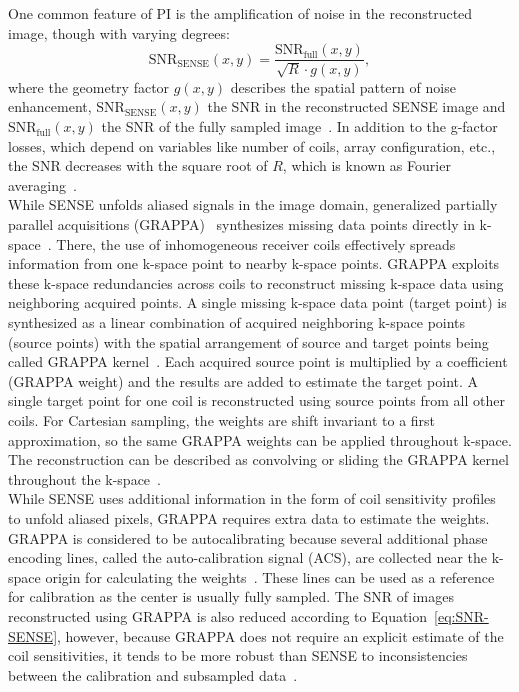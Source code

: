 One common feature of PI is the amplification of noise in the reconstructed image, though with varying degrees:
\begin{equation} \label{eq:SNR-SENSE}
	\text{SNR}_{\text{SENSE}}(x,y) = \frac{\text{SNR}_{\text{full}}(x,y)}{\sqrt{R} \cdot g(x,y)},
\end{equation}
where the geometry factor $g(x,y)$ describes the spatial pattern of noise enhancement, $\text{SNR}_{\text{SENSE}}(x,y)$ the SNR in the reconstructed SENSE image and $\text{SNR}_{\text{full}}(x,y)$ the SNR of the fully sampled image~\cite{AdvancesPI}. In addition to the g-factor losses, which depend on variables like number of coils, array configuration, etc., the SNR decreases with the square root of $R$, which is known as Fourier averaging~\cite{AdvancesPI}.\\
While SENSE unfolds aliased signals in the image domain, generalized partially parallel acquisitions (GRAPPA)~\cite{GRAPPA} synthesizes missing data points directly in k-space~\cite{ParallelMRI}. There, the use of inhomogeneous receiver coils effectively spreads information from one k-space point to nearby k-space points. GRAPPA exploits these k-space redundancies across coils to reconstruct missing k-space data using neighboring acquired points. A single missing k-space data point (target point) is synthesized as a linear combination of acquired neighboring k-space points (source points) with the spatial arrangement of source and target points being called GRAPPA kernel~\cite{ParallelMRI}. Each acquired source point is multiplied by a coefficient (GRAPPA weight) and the results are added to estimate the target point. A single target point for one coil is reconstructed using source points from all other coils. For Cartesian sampling, the weights are shift invariant to a first approximation, so the same GRAPPA weights can be applied throughout k-space. The reconstruction can be described as convolving or sliding the GRAPPA kernel throughout the k-space~\cite{AdvancesPI}. \\
While SENSE uses additional information in the form of coil sensitivity profiles to unfold aliased pixels, GRAPPA requires extra data to estimate the weights. GRAPPA is considered to be autocalibrating because several additional phase encoding lines, called the auto-calibration signal (ACS), are collected near the k-space origin for calculating the weights~\cite{ParallelMRI}. These lines can be used as a reference for calibration as the center is usually fully sampled. The SNR of images reconstructed using GRAPPA is also reduced according to Equation~\ref{eq:SNR-SENSE}, however, because GRAPPA does not require an explicit estimate of the coil sensitivities, it tends to be more robust than SENSE to inconsistencies between the calibration and subsampled data~\cite{AdvancesPI}.\\
